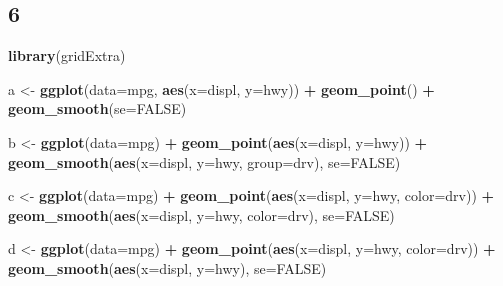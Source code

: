 \documentclass[]{article}
\newenvironment{Shaded}{\begin{snugshade}}{\end{snugshade}}
\newcommand{\DataTypeTok}[1]{\textcolor[rgb]{0.13,0.29,0.53}{#1}}
\newcommand{\KeywordTok}[1]{\textcolor[rgb]{0.13,0.29,0.53}{\textbf{#1}}}
\newcommand{\NormalTok}[1]{#1}
\newcommand{\OperatorTok}[1]{\textcolor[rgb]{0.81,0.36,0.00}{\textbf{#1}}}
\newcommand{\OtherTok}[1]{\textcolor[rgb]{0.56,0.35,0.01}{#1}}
\newcommand{\StringTok}[1]{\textcolor[rgb]{0.31,0.60,0.02}{#1}}
\begin{document}
\hypertarget{section-6}{%
\subsection{6}\label{section-6}}

\begin{Shaded}
\begin{Highlighting}[]
\KeywordTok{library}\NormalTok{(gridExtra)}

\NormalTok{a <-}\StringTok{  }\KeywordTok{ggplot}\NormalTok{(}\DataTypeTok{data=}\NormalTok{mpg, }\KeywordTok{aes}\NormalTok{(}\DataTypeTok{x=}\NormalTok{displ, }\DataTypeTok{y=}\NormalTok{hwy)) }\OperatorTok{+}\StringTok{ }
\StringTok{  }\KeywordTok{geom_point}\NormalTok{() }\OperatorTok{+}\StringTok{ }
\StringTok{  }\KeywordTok{geom_smooth}\NormalTok{(}\DataTypeTok{se=}\OtherTok{FALSE}\NormalTok{)}

\NormalTok{b <-}\StringTok{  }\KeywordTok{ggplot}\NormalTok{(}\DataTypeTok{data=}\NormalTok{mpg) }\OperatorTok{+}\StringTok{ }
\StringTok{  }\KeywordTok{geom_point}\NormalTok{(}\KeywordTok{aes}\NormalTok{(}\DataTypeTok{x=}\NormalTok{displ, }\DataTypeTok{y=}\NormalTok{hwy)) }\OperatorTok{+}\StringTok{ }
\StringTok{  }\KeywordTok{geom_smooth}\NormalTok{(}\KeywordTok{aes}\NormalTok{(}\DataTypeTok{x=}\NormalTok{displ, }\DataTypeTok{y=}\NormalTok{hwy, }\DataTypeTok{group=}\NormalTok{drv), }\DataTypeTok{se=}\OtherTok{FALSE}\NormalTok{)}

\NormalTok{c <-}\StringTok{ }\KeywordTok{ggplot}\NormalTok{(}\DataTypeTok{data=}\NormalTok{mpg) }\OperatorTok{+}\StringTok{ }
\StringTok{  }\KeywordTok{geom_point}\NormalTok{(}\KeywordTok{aes}\NormalTok{(}\DataTypeTok{x=}\NormalTok{displ, }\DataTypeTok{y=}\NormalTok{hwy, }\DataTypeTok{color=}\NormalTok{drv)) }\OperatorTok{+}\StringTok{ }
\StringTok{  }\KeywordTok{geom_smooth}\NormalTok{(}\KeywordTok{aes}\NormalTok{(}\DataTypeTok{x=}\NormalTok{displ, }\DataTypeTok{y=}\NormalTok{hwy, }\DataTypeTok{color=}\NormalTok{drv), }\DataTypeTok{se=}\OtherTok{FALSE}\NormalTok{)}

\NormalTok{d <-}\StringTok{ }\KeywordTok{ggplot}\NormalTok{(}\DataTypeTok{data=}\NormalTok{mpg) }\OperatorTok{+}\StringTok{ }
\StringTok{  }\KeywordTok{geom_point}\NormalTok{(}\KeywordTok{aes}\NormalTok{(}\DataTypeTok{x=}\NormalTok{displ, }\DataTypeTok{y=}\NormalTok{hwy, }\DataTypeTok{color=}\NormalTok{drv)) }\OperatorTok{+}\StringTok{ }
\StringTok{  }\KeywordTok{geom_smooth}\NormalTok{(}\KeywordTok{aes}\NormalTok{(}\DataTypeTok{x=}\NormalTok{displ, }\DataTypeTok{y=}\NormalTok{hwy), }\DataTypeTok{se=}\OtherTok{FALSE}\NormalTok{)}


\end{Highlighting}
\end{Shaded}
\end{document}

